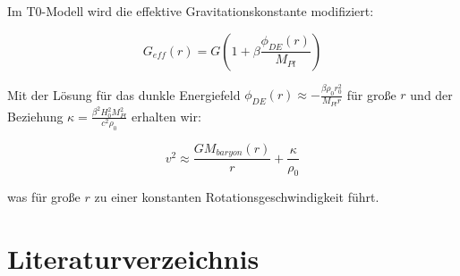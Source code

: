 \documentclass[a4paper,12pt]{article}
\begin{document}
	Im T0-Modell wird die effektive Gravitationskonstante modifiziert:
	
	\begin{equation}
		G_{eff}(r) = G\left(1 + \beta\frac{\phi_{DE}(r)}{M_{Pl}}\right)
	\end{equation}
	
	Mit der Lösung für das dunkle Energiefeld $\phi_{DE}(r) \approx -\frac{\beta\rho_0 r_0^2}{M_{Pl}r}$ für große $r$ und der Beziehung $\kappa = \frac{\beta^2 H_0^2 M_{Pl}^2}{c^2 \rho_0}$ erhalten wir:
	
	\begin{equation}
		v^2 \approx \frac{GM_{baryon}(r)}{r} + \frac{\kappa}{\rho_0}
	\end{equation}
	
	was für große $r$ zu einer konstanten Rotationsgeschwindigkeit führt.
	
	\section{Literaturverzeichnis}
	
\end{document}
